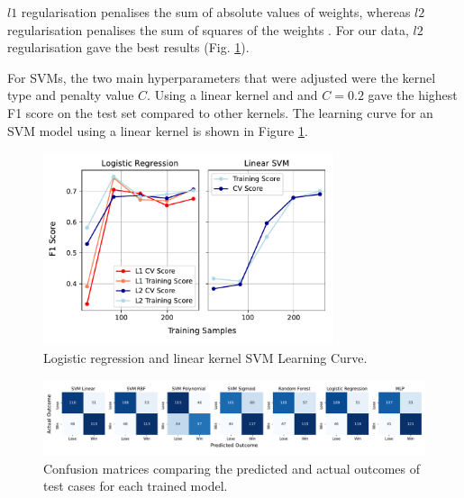 $l1$ regularisation penalises the sum of absolute values of weights, whereas $l2$ regularisation penalises the sum of squares of the weights \cite{ahmadian1998regularisation}. For our data, $l2$ regularisation gave the best results (Fig. \ref{fig:learningcurve}).

For SVMs, the two main hyperparameters that were adjusted were the kernel type and penalty value $C$. Using a linear kernel and and $C=0.2$ gave the highest F1 score on the test set compared to other kernels. The learning curve for an SVM model using a linear kernel is shown in Figure \ref{fig:learningcurve}.

\begin{figure}[ht]
\includegraphics[width=8.5cm]{plots/learningcurves.pdf}
\caption{Logistic regression and linear kernel SVM Learning Curve.}
\label{fig:learningcurve}
\centering
\end{figure}


\begin{figure}[h]
\centering
\includegraphics[width=18cm]{plots/confusionmatrices.pdf}
\vspace{-1em}
\caption{Confusion matrices comparing the predicted and actual outcomes of test cases for each trained model.}

\label{fig:confusionmatrices}
\centering
\end{figure}

